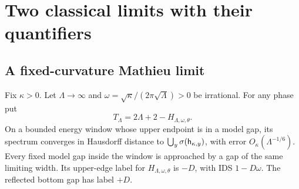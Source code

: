 \section{Two classical limits with their quantifiers}\label{app:limits}
\subsection{A fixed-curvature Mathieu limit}
\begin{proposition}\label{prop:fixedkappa}
Fix $\kappa>0$. Let $\Lambda\to\infty$ and
$\omega=\sqrt\kappa/(2\pi\sqrt\Lambda)>0$ be irrational. For any phase put
\[
 T_\Lambda=2\Lambda+2-H_{\Lambda,\omega,\theta}.
\]
On a bounded energy window whose upper endpoint is in a model gap, its spectrum converges in Hausdorff distance to
$\bigcup_y\sigma(\mathsf h_{\kappa,y})$, with error $O_\kappa(\Lambda^{-1/6})$. Every fixed model gap inside the window is approached by a gap of the same limiting width. Its upper-edge label for $H_{\Lambda,\omega,\theta}$ is $-D$, with IDS $1-D\omega$. The reflected bottom gap has label $+D$.
\end{proposition}
